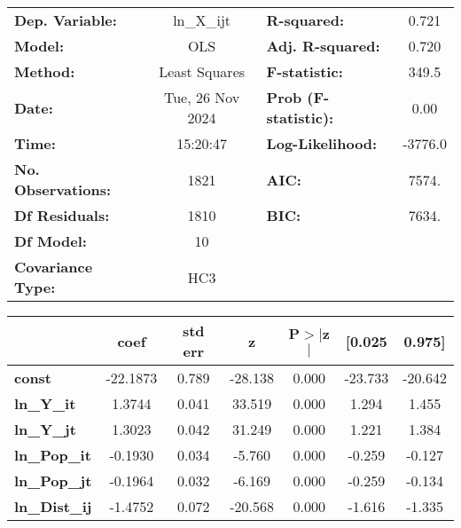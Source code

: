 \begin{center}
\begin{tabular}{lclc}
\toprule
\textbf{Dep. Variable:}    &    ln\_X\_ijt    & \textbf{  R-squared:         } &     0.721   \\
\textbf{Model:}            &       OLS        & \textbf{  Adj. R-squared:    } &     0.720   \\
\textbf{Method:}           &  Least Squares   & \textbf{  F-statistic:       } &     349.5   \\
\textbf{Date:}             & Tue, 26 Nov 2024 & \textbf{  Prob (F-statistic):} &     0.00    \\
\textbf{Time:}             &     15:20:47     & \textbf{  Log-Likelihood:    } &   -3776.0   \\
\textbf{No. Observations:} &        1821      & \textbf{  AIC:               } &     7574.   \\
\textbf{Df Residuals:}     &        1810      & \textbf{  BIC:               } &     7634.   \\
\textbf{Df Model:}         &          10      & \textbf{                     } &             \\
\textbf{Covariance Type:}  &       HC3        & \textbf{                     } &             \\
\bottomrule
\end{tabular}
\begin{tabular}{lcccccc}
                      & \textbf{coef} & \textbf{std err} & \textbf{z} & \textbf{P$> |$z$|$} & \textbf{[0.025} & \textbf{0.975]}  \\
\midrule
\textbf{const}        &     -22.1873  &        0.789     &   -28.138  &         0.000        &      -23.733    &      -20.642     \\
\textbf{ln\_Y\_it}    &       1.3744  &        0.041     &    33.519  &         0.000        &        1.294    &        1.455     \\
\textbf{ln\_Y\_jt}    &       1.3023  &        0.042     &    31.249  &         0.000        &        1.221    &        1.384     \\
\textbf{ln\_Pop\_it}  &      -0.1930  &        0.034     &    -5.760  &         0.000        &       -0.259    &       -0.127     \\
\textbf{ln\_Pop\_jt}  &      -0.1964  &        0.032     &    -6.169  &         0.000        &       -0.259    &       -0.134     \\
\textbf{ln\_Dist\_ij} &      -1.4752  &        0.072     &   -20.568  &         0.000        &       -1.616    &       -1.335     \\

\end{tabular}
\end{center}
